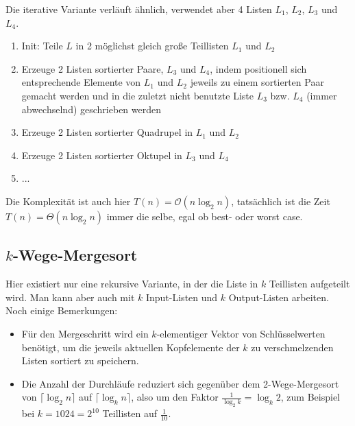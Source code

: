 Die iterative Variante verläuft ähnlich, verwendet aber 4 Listen $L_1$, $L_2$, $L_3$ und $L_4$.
\begin{enumerate}
	\item Init: Teile $L$ in 2 möglichst gleich große Teillisten $L_1$ und $L_2$
	\item Erzeuge 2 Listen sortierter Paare, $L_3$ und $L_4$, indem positionell sich entsprechende Elemente von $L_1$ und $L_2$ jeweils zu einem sortierten Paar gemacht werden und in die zuletzt nicht benutzte Liste $L_3$ bzw. $L_4$ (immer abwechselnd) geschrieben werden
	\item Erzeuge 2 Listen sortierter Quadrupel in $L_1$ und $L_2$
	\item Erzeuge 2 Listen sortierter Oktupel in $L_3$ und $L_4$
	\item ...
\end{enumerate}

Die Komplexität ist auch hier $T(n)=\mathcal{O}(n\log_2 n)$, tatsächlich ist die Zeit $T(n)=\Theta(n\log_2 n)$ immer die selbe, egal ob best- oder worst case.

\subsection{$k$-Wege-Mergesort}

Hier existiert nur eine rekursive Variante, in der die Liste in $k$ Teillisten aufgeteilt wird. Man kann aber auch mit $k$ Input-Listen und $k$ Output-Listen arbeiten. Noch einige Bemerkungen:
\begin{itemize}
	\item Für den Mergeschritt wird ein $k$-elementiger Vektor von Schlüsselwerten benötigt, um die jeweils aktuellen Kopfelemente der $k$ zu verschmelzenden Listen sortiert zu speichern.
	\item Die Anzahl der Durchläufe reduziert sich gegenüber dem 2-Wege-Mergesort von $\lceil\log_2 n\rceil$ auf $\lceil\log_k n\rceil$, also um den Faktor $\frac{1}{\log_2 k}=\log_k 2$, zum Beispiel bei $k=1024=2^{10}$ Teillisten auf $\frac{1}{10}$.
\end{itemize}

